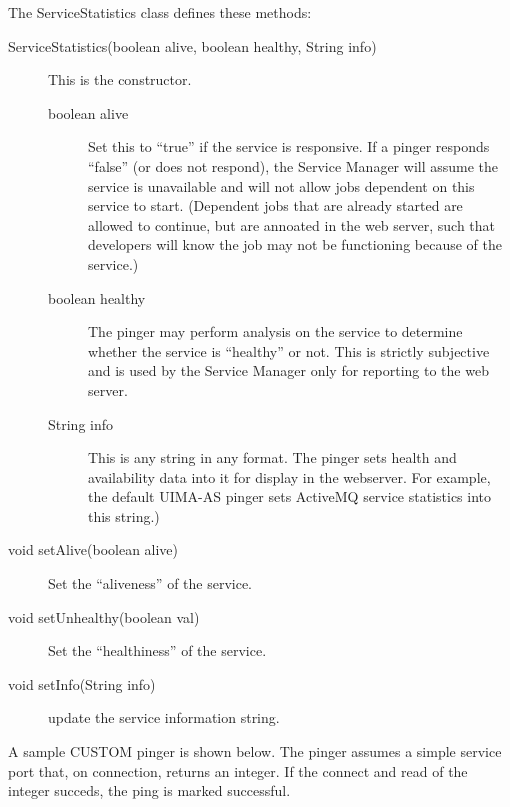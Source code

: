       The ServiceStatistics class defines these methods:
      \begin{description}
        \item[ServiceStatistics(boolean alive, boolean healthy, String info)] This is the constructor.
          \begin{description}
            \item[boolean alive] Set this to ``true'' if the service is responsive.  If a pinger responds
              ``false'' (or does not respond), the Service Manager will assume the service is unavailable
              and will not allow jobs dependent on this service to start.  (Dependent jobs that are already
              started are allowed to continue, but are annoated in the web server, such that developers
              will know the job may not be functioning because of the service.)
            \item[boolean healthy] The pinger may perform analysis on the service to determine whether
              the service is ``healthy'' or not.  This is strictly subjective and is used by the
              Service Manager only for reporting to the web server.
            \item[String info] This is any string in any format.  The pinger sets health and availability
              data into it for display in the webserver.  For example, the default UIMA-AS pinger sets
              ActiveMQ service statistics into this string.)
          \end{description}
          
          \item[void setAlive(boolean alive)] Set the ``aliveness'' of the service.

          \item[void setUnhealthy(boolean val)] Set the ``healthiness'' of the service.
            
          \item[void setInfo(String info)] update the service information string.
      \end{description}

      A sample CUSTOM pinger is shown below. The pinger assumes a simple
      service port that, on connection, returns an integer.  If the connect and read of the integer succeds,
      the ping is marked successful. 

